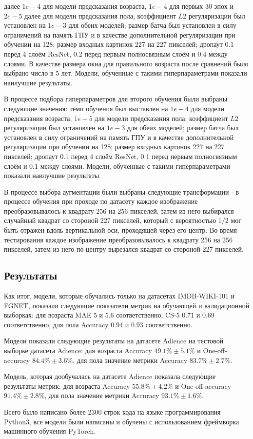 далее $1e-4$ для модели предсказания возраста, $1e-4$ для первых 30 эпох и $2e-5$ далее для модели предсказания пола;
коэффициент $L2$ регуляризации был установлен на $1e-3$ для обеих моделей;
размер батча был установлен в силу ограничений на память ГПУ и в качестве дополнительной регуляризации при обучении на 128;
размер входных картинок 227 на 227 пикселей;
дропаут 0.1 перед 4 слоём ResNet, 0.2 перед первым полносвязным слоём и 0.4 между слоями.
В качестве размера окна для правильного возраста после сравнений было выбрано число в 5 лет.
Модели, обученные с такими гиперпараметрами показали наилучшие результаты.
\par В процессе подбора гиперпараметров для второго обучения были выбраны следующие значения: темп обучения был выставлен на $1e-4$ для модели предсказания возраста,
$1e-5$ для модели предсказания пола;
коэффициент $L2$ регуляризации был установлен на $1e-3$ для обеих моделей;
размер батча был установлен в силу ограничений на память ГПУ и в качестве дополнительной регуляризации при обучении на 128;
размер входных картинок 227 на 227 пикселей;
дропаут 0.1 перед 4 слоём ResNet, 0.1 перед первым полносвязным слоём и 0.1 между слоями.
Модели, обученные с такими гиперпараметрами показали наилучшие результаты.
\par В процессе выбора аугментации были выбраны следующие трансформации -
в процессе обучения при проходе по датасету каждое изображение преобразовывалось к квадрату 256 на 256 пикселей,
затем из него выбирался случайный квадрат со стороной 227 пикселей,
который с вероятностью $1/2$ мог быть отражен вдоль вертикальной оси, проходящей через его центр.
Во время тестирования каждое изображение преобразовывалось к квадрату 256 на 256 пикселей,
затем из него по центру вырезался квадрат со стороной 227 пикселей.

\subsection{Результаты}\label{subsec:результаты}
Как итог, модели, которые обучались только на датасетах IMDB-WIKI-101 и FGNET, показали следующие показатели метрик на обучающей и валидационной выборках: для возраста MAE 5 и 5.6 соответственно,
CS-5 0.71 и 0.69 соответственно, для пола Accuracy 0.94 и 0.93 соответственно.
\par Модели показали следующие результаты на датасете Adience на тестовой выборке датасета Adience: для возраста Accuracy $49.1\% \pm 5.1 \%$ и One-off-accuracy $84.4\% \pm 3.6 \%$,
для пола значение метрики Accuracy $83.7\% \pm 2.7\%$.
\par Модель, которая дообучалась на датасете Adience показала следующие результаты метрик: для возраста Accuracy $55.8\% \pm 4.2 \%$ и One-off-accuracy $91.4\% \pm 2.8 \%$,
для пола значение метрики Accuracy $93.1\% \pm 1.6\%$.
\par Всего было написано более 2300 строк кода на языке программирования Python3,
все модели были написаны и обучены с использованием фреймворка машинного обучения PyTorch.
\newpage

